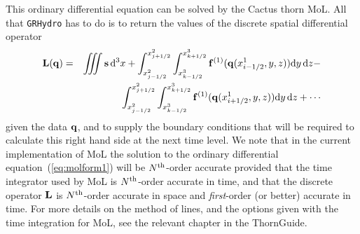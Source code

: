 \documentclass{article}
\begin{document}
This ordinary differential equation can be solved by the Cactus thorn
MoL. All that {\tt GRHydro} has to do is to return the values of the discrete
spatial differential operator
\begin{eqnarray}
  \label{eq:molrhs1} \nonumber
  {\bf L}({\bf q}) & = & \int \!\!\!\! \int \!\!\!\!
      \int {\bf s} \,{\rm d}^3 x + \int_{x^2_{j-1/2}}^{x^2_{j+1/2}}
    \int_{x^3_{k-1/2}}^{x^3_{k+1/2}} {\bf f}^{(1)} ({\bf q}
    (x^1_{i-1/2}, y, z)) {\rm d} y \, {\rm d} z - \\
    &&    \int_{x^2_{j-1/2}}^{x^2_{j+1/2}} 
    \int_{x^3_{k-1/2}}^{x^3_{k+1/2}} {\bf f}^{(1)} ({\bf q}
    (x^1_{i+1/2}, y, z)) {\rm d} y \, {\rm d} z + \cdots
\end{eqnarray}
given the data ${\bf q}$, and to supply the boundary conditions that will
be required to calculate this right hand side at the next time level.
We note that in the current implementation of MoL the solution to the
ordinary differential equation~(\ref{eq:molform1}) will be $N^{\rm
  th}$-order accurate provided that the time integrator used by MoL is $N^{\rm
  th}$-order accurate in time, and that the discrete operator ${\bf L}$ is
$N^{\rm th}$-order accurate in space and {\it first}-order (or better)
accurate in time.  For more details on the method of lines, and the
options given with the time integration for MoL, see the relevant
chapter in the ThornGuide.
\end{document}
